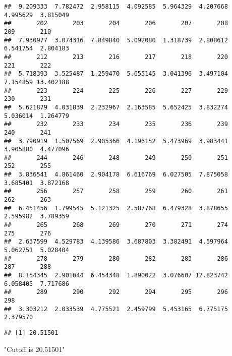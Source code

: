 \documentclass[
]{article}
\newenvironment{Shaded}{\begin{snugshade}}{\end{snugshade}}
\newcommand{\CommentTok}[1]{\textcolor[rgb]{0.56,0.35,0.01}{\textit{#1}}}
\newcommand{\DecValTok}[1]{\textcolor[rgb]{0.00,0.00,0.81}{#1}}
\newcommand{\FloatTok}[1]{\textcolor[rgb]{0.00,0.00,0.81}{#1}}
\newcommand{\KeywordTok}[1]{\textcolor[rgb]{0.13,0.29,0.53}{\textbf{#1}}}
\newcommand{\NormalTok}[1]{#1}
\newcommand{\StringTok}[1]{\textcolor[rgb]{0.31,0.60,0.02}{#1}}
\begin{document}
\begin{verbatim}
##  9.209333  7.782472  2.958115  4.092585  5.964329  4.207668  4.995629  3.815049 
##       202       203       204       206       207       208       209       210 
##  7.930977  3.074316  7.849840  5.092080  1.318739  2.808612  6.541754  2.804183 
##       212       213       216       217       218       220       221       222 
##  5.718393  3.525487  1.259470  5.655145  3.041396  3.497104  7.154859 13.402188 
##       223       224       225       226       227       229       230       231 
##  5.621879  4.031839  2.232967  2.163585  5.652425  3.832274  5.036014  1.264779 
##       232       233       234       235       236       239       240       241 
##  3.790919  1.507569  2.905366  4.196152  5.473969  3.983441  3.905880  4.477096 
##       244       246       248       249       250       251       252       255 
##  3.836541  4.861460  2.904178  6.616769  6.027505  7.875058  3.685401  3.872168 
##       256       257       258       259       260       261       262       263 
##  6.451456  1.799545  5.121325  2.587768  6.479328  3.878655  2.595982  3.789359 
##       265       268       269       270       271       274       275       276 
##  2.637599  4.529783  4.139586  3.687803  3.382491  4.597964  5.062751  5.028404 
##       278       279       280       282       283       286       287       288 
##  8.154345  2.901044  6.454348  1.890022  3.076607 12.823742  6.058405  7.717686 
##       289       290       292       294       295       296       298 
##  3.303212  2.033539  4.775521  2.459799  5.453165  6.775175  2.379570
\end{verbatim}

\begin{Shaded}
\end{Shaded}

\begin{verbatim}
## [1] 20.51501
\end{verbatim}

\begin{Shaded}
\begin{Highlighting}[]
\StringTok{"Cutoff is 20.51501"}
\end{Highlighting}
\end{Shaded}
\end{document}
